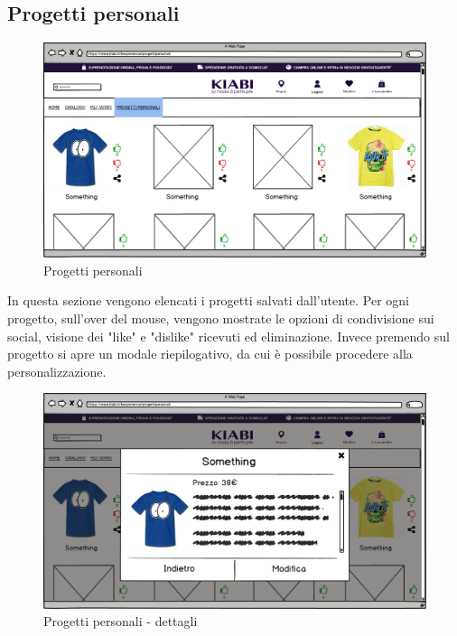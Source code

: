 \documentclass[12pt,italian,]{report}
\begin{document}
\hypertarget{progetti-personali}{%
\subsection{Progetti personali}\label{progetti-personali}}

\begin{figure}[h]
\centering
\includegraphics{../balsamiq/balsamiq_finale/ProgettiPersonali.png}
\caption{Progetti personali}
\end{figure}

In questa sezione vengono elencati i progetti salvati dall'utente. Per ogni progetto, sull'over del mouse, vengono mostrate le opzioni di condivisione sui social, visione dei "like" e "dislike" ricevuti ed eliminazione. Invece premendo sul progetto si apre un modale riepilogativo, da cui è possibile procedere alla personalizzazione.

\begin{figure}[h]
\centering
\includegraphics{../balsamiq/balsamiq_finale/ProgettiPersonalidetails.png}
\caption{Progetti personali - dettagli}
\end{figure}
\end{document}
